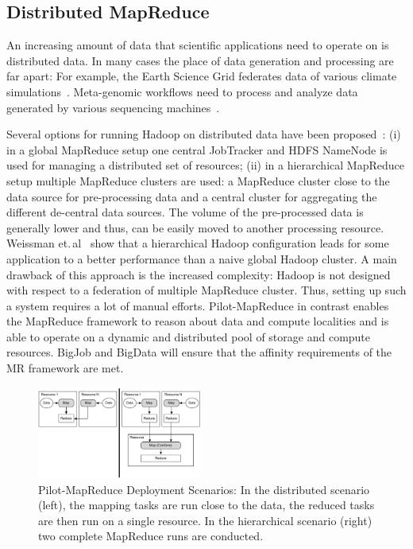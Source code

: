\documentclass{acm_proc_article-sp}
\newcommand{\pilotmapreduce}{Pilot-MapReduce\xspace}
\begin{document}
\subsection{Distributed MapReduce}
\label{sec:pmr-distributed}
An increasing amount of data that scientific applications need to operate on 
is distributed data. In many cases the place of data 
generation and processing are far apart: For example, the Earth Science Grid 
federates data of various climate simulations~\cite{ESG}. Meta-genomic 
workflows need to process and analyze data generated by various sequencing 
machines~\cite{Jha:2011fk}.

Several options for running Hadoop on distributed data have been
proposed~\cite{weissman-mr-11}: (i) in a global MapReduce setup one central
JobTracker and HDFS NameNode is used for managing a distributed set of
resources; (ii) in a hierarchical MapReduce setup multiple MapReduce clusters
are used: a MapReduce cluster close to the data source for pre-processing data
and a central cluster for aggregating the different de-central data sources. The
volume of the pre-processed data is generally lower and thus, can be easily
moved to another processing resource. Weissman et.\,al~\cite{weissman-mr-11}
show that a hierarchical Hadoop configuration leads for some application to a
better performance than a naive global Hadoop cluster. A main drawback of this
approach is the increased complexity: Hadoop is not designed with respect to a
federation of multiple MapReduce cluster. Thus, setting up such a system
requires a lot of manual efforts. \pilotmapreduce in contrast enables the
MapReduce framework to reason about data and compute localities and is able to
operate on a dynamic and distributed pool of storage and compute resources.
BigJob and BigData will ensure that the affinity requirements of the MR
framework are met.

\begin{figure}
	\centering
	\includegraphics[width=0.48\textwidth]{figures/distributed_hierachical.pdf}
	\caption{\pilotmapreduce Deployment 
	Scenarios: In the distributed scenario (left), the mapping tasks are run close to the data, the reduced tasks are then run on a single resource. In the hierarchical scenario (right) two complete MapReduce runs are conducted. \label{fid:distributed-mapreduce-overview}}
\end{figure}
\end{document}
